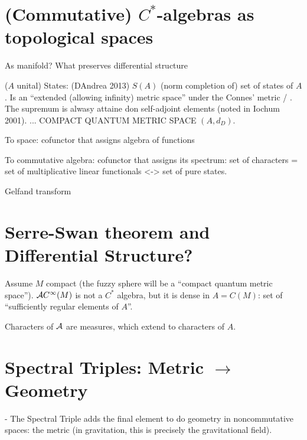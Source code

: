 \linea

\section{(Commutative) $C^*$-algebras as topological spaces}

As manifold? What preserves differential structure

($A$ unital) States: (DAndrea 2013) $S(A)$ (norm completion of) set of states of $A$. Is an ``extended (allowing infinity) metric space'' under the Connes' metric / . The supremum is alwasy attaine don self-adjoint elements (noted in Iochum 2001). ... COMPACT QUANTUM METRIC SPACE $(A,  d_{D})$.

To space: cofunctor that assigns algebra of functions

To commutative algebra: cofunctor that assigns its spectrum: set of characters = set of multiplicative linear functionals <-> set of pure states.

Gelfand transform

\section{Serre-Swan theorem and Differential Structure?}

Assume $M$ compact (the fuzzy sphere will be a ``compact quantum metric space''). $\mathcal A C^\infty(M)$ is not a $C^*$ algebra, but it is dense in $A = C(M)$: set of ``sufficiently regular elements of $A$''.

Characters of $\mathcal A$ are measures, which extend to characters of $A$.

\section{Spectral Triples: Metric $\to$ Geometry}

 - The Spectral Triple adds the final element to do geometry in noncommutative spaces: the metric (in gravitation, this is precisely the gravitational field).
 
